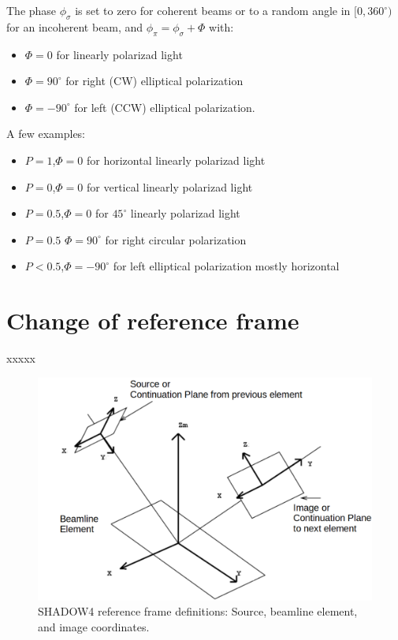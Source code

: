 \documentclass{iucr}
\begin{document}
The phase $\phi_\sigma$ is set to zero for coherent beams or to a random angle in $[0,360^{\circ})$ for an incoherent beam, and
$\phi_\pi=\phi_\sigma+\Phi$ with: 
\begin{itemize}
 \item $\Phi=0$ for linearly polarizad light 
 \item $\Phi=90^{\circ}$ for right (CW) elliptical polarization
 \item $\Phi=-90^{\circ}$ for left (CCW) elliptical polarization.
\end{itemize}
A few examples: 
\begin{itemize}
 \item $P=1$,$\Phi=0$ for horizontal linearly polarizad light 
 \item $P=0$,$\Phi=0$ for vertical linearly polarizad light
 \item $P=0.5$,$\Phi=0$ for $45^\circ$ linearly polarizad light
 \item $P=0.5$ $\Phi=90^{\circ}$ for right circular polarization
 \item $P<0.5$,$\Phi=-90^{\circ}$ for left elliptical polarization mostly horizontal
\end{itemize}


\section{Change of reference frame}
\label{sec:change_frame}

xxxxx

\begin{figure}
\label{fig:S4_reference_frame}
    \centering
\includegraphics[width=0.9\linewidth]{figures/S4_reference_frame.png}
\caption{SHADOW4 reference frame definitions: Source, beamline element, and image coordinates.}  
\end{figure}
\end{document}
